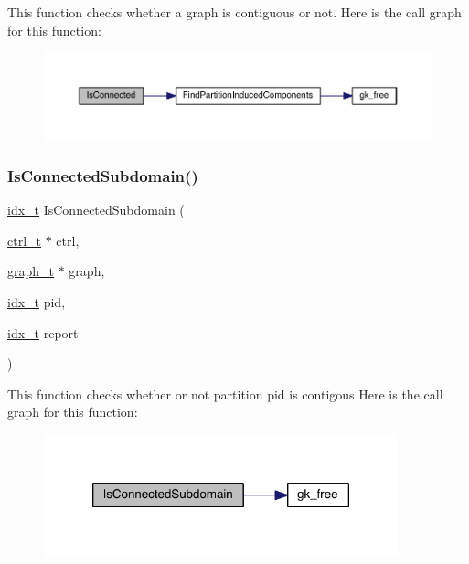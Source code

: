 This function checks whether a graph is contiguous or not. Here is the call graph for this function\+:\nopagebreak
\begin{figure}[H]
\begin{center}
\leavevmode
\includegraphics[width=350pt]{a00188_a06638e74c8e49f9fb9881b960f8c4f05_cgraph}
\end{center}
\end{figure}
\mbox{\label{a00188_aa6e8cf71404dada70fbba7451df92acb}} 
\subsubsection{\texorpdfstring{Is\+Connected\+Subdomain()}{IsConnectedSubdomain()}}
{\footnotesize\ttfamily \hyperlink{a00876_aaa5262be3e700770163401acb0150f52}{idx\+\_\+t} Is\+Connected\+Subdomain (\begin{DoxyParamCaption}\item[{\hyperlink{a00742}{ctrl\+\_\+t} $\ast$}]{ctrl,  }\item[{\hyperlink{a00734}{graph\+\_\+t} $\ast$}]{graph,  }\item[{\hyperlink{a00876_aaa5262be3e700770163401acb0150f52}{idx\+\_\+t}}]{pid,  }\item[{\hyperlink{a00876_aaa5262be3e700770163401acb0150f52}{idx\+\_\+t}}]{report }\end{DoxyParamCaption})}

This function checks whether or not partition pid is contigous Here is the call graph for this function\+:\nopagebreak
\begin{figure}[H]
\begin{center}
\leavevmode
\includegraphics[width=290pt]{a00188_aa6e8cf71404dada70fbba7451df92acb_cgraph}
\end{center}
\end{figure}
\mbox{\label{a00188_a59be93c110982dd4b4e918957804e3b7}} 
